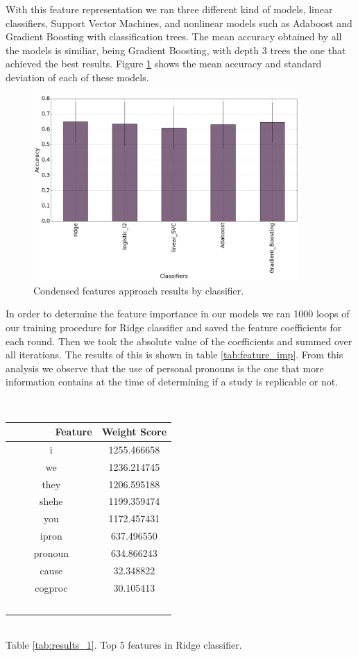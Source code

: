 \documentclass[12pt]{article}
\begin{document}
With this feature representation we ran three different kind of models, linear classifiers, Support Vector Machines, and nonlinear models such as Adaboost and Gradient Boosting with classification trees. The mean accuracy obtained by all the models is similiar, being Gradient Boosting, with depth 3 trees the one that achieved the best results. Figure \ref{fig:results2} shows the mean accuracy and standard deviation of each of these models. 

\begin{figure}[htbp]
    \centering
    \includegraphics[width=0.9\textwidth]{barplot_index_classifiers}
    \caption{Condensed features approach results by classifier.}
    \label{fig:results2}
\end{figure}

In order to determine the feature importance in our models we ran 1000 loops of our training procedure for Ridge classifier and saved the feature coefficients for each round. Then we took the absolute value of the coefficients and summed over all iterations. The results of this is shown in table \ref{tab:feature_imp}. From this analysis we observe that the use of personal pronouns is the one that more information contains at the time of determining if a study is replicable or not. 

\begin{center}
\label{tab:feature_imp}
    \begin{tabular}{c|c}
        Feature     & Weight Score \\ \hline \hline
        i           & 1255.466658  \\ 
        we          & 1236.214745  \\ 
        they        & 1206.595188  \\ 
        shehe       & 1199.359474  \\ 
        you         & 1172.457431  \\
        ipron       &  637.496550  \\
        pronoun     &  634.866243  \\
        cause       &   32.348822  \\
        cogproc     &   30.105413  \\
    \end{tabular} \\

    Table \ref{tab:results_1}. Top 5 features in Ridge classifier.  
\end{center}
\end{document}
